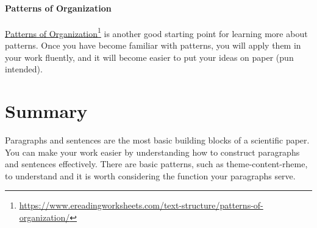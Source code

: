 \paragraph{Patterns of Organization}
\href{https://www.ereadingworksheets.com/text-structure/patterns-of-organization/}{Patterns of Organization}\footnote{\url{https://www.ereadingworksheets.com/text-structure/patterns-of-organization/}} is another good starting point for learning more about patterns.
Once you have become familiar with patterns, you will apply them in your work fluently, and it will become easier to put your ideas on paper (pun intended).

\section{Summary}

Paragraphs and sentences are the most basic building blocks of a scientific paper. You can make your work easier by understanding how to construct paragraphs and sentences effectively. There are basic patterns, such as theme-content-rheme, to understand and it is worth considering the function your paragraphs serve.
